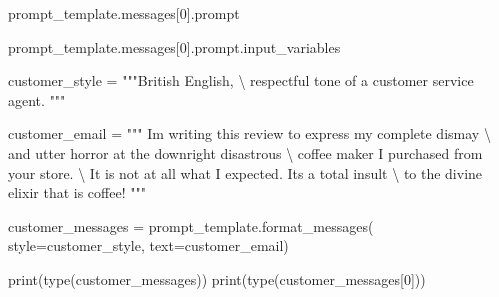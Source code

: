 \documentclass[
  letterpaper,
  DIV=11,
  numbers=noendperiod]{scrreprt}
\newenvironment{Shaded}{\begin{snugshade}}{\end{snugshade}}
\newcommand{\BuiltInTok}[1]{\textcolor[rgb]{0.00,0.23,0.31}{#1}}
\newcommand{\CharTok}[1]{\textcolor[rgb]{0.13,0.47,0.30}{#1}}
\newcommand{\DecValTok}[1]{\textcolor[rgb]{0.68,0.00,0.00}{#1}}
\newcommand{\NormalTok}[1]{\textcolor[rgb]{0.00,0.23,0.31}{#1}}
\newcommand{\OperatorTok}[1]{\textcolor[rgb]{0.37,0.37,0.37}{#1}}
\newcommand{\StringTok}[1]{\textcolor[rgb]{0.13,0.47,0.30}{#1}}
\begin{document}
\begin{Shaded}
\begin{Highlighting}[]
\NormalTok{prompt\_template.messages[}\DecValTok{0}\NormalTok{].prompt}
\end{Highlighting}
\end{Shaded}

\begin{Shaded}
\begin{Highlighting}[]
\NormalTok{prompt\_template.messages[}\DecValTok{0}\NormalTok{].prompt.input\_variables}
\end{Highlighting}
\end{Shaded}

\begin{Shaded}
\begin{Highlighting}[]
\NormalTok{customer\_style }\OperatorTok{=} \StringTok{"""British English, }\CharTok{\textbackslash{}}
\StringTok{ respectful tone of a customer service agent.}
\StringTok{"""}
\end{Highlighting}
\end{Shaded}

\begin{Shaded}
\begin{Highlighting}[]
\NormalTok{customer\_email }\OperatorTok{=} \StringTok{"""}
\StringTok{I\textquotesingle{}m writing this review to express my complete dismay }\CharTok{\textbackslash{}}
\StringTok{and utter horror at the downright disastrous }\CharTok{\textbackslash{}}
\StringTok{coffee maker I purchased from your store. }\CharTok{\textbackslash{}}
\StringTok{It is not at all what I expected. It\textquotesingle{}s a total insult }\CharTok{\textbackslash{}}
\StringTok{to the divine elixir that is coffee!}
\StringTok{"""}
\end{Highlighting}
\end{Shaded}

\begin{Shaded}
\begin{Highlighting}[]
\NormalTok{customer\_messages }\OperatorTok{=}\NormalTok{ prompt\_template.format\_messages(}
\NormalTok{                    style}\OperatorTok{=}\NormalTok{customer\_style,}
\NormalTok{                    text}\OperatorTok{=}\NormalTok{customer\_email)}
\end{Highlighting}
\end{Shaded}

\begin{Shaded}
\begin{Highlighting}[]
\BuiltInTok{print}\NormalTok{(}\BuiltInTok{type}\NormalTok{(customer\_messages))}
\BuiltInTok{print}\NormalTok{(}\BuiltInTok{type}\NormalTok{(customer\_messages[}\DecValTok{0}\NormalTok{]))}
\end{Highlighting}
\end{Shaded}
\end{document}

